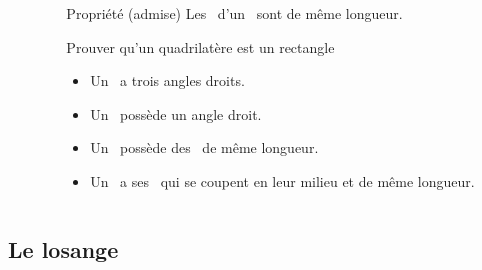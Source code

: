 \documentclass{beamer}
\begin{document}
\begin{frame}
	\frametitle{}  
	\framesubtitle{}
	
		
	\begin{columns}[onlytextwidth]	
		
		\begin{column}{0.4\textwidth}
		\end{column}
		
		\begin{column}{0.6\textwidth}
			
			\begin{alertblock}{Propriété (admise)}
				Les \diags\ d'un \rect\ sont de même longueur.
			\end{alertblock}
			
			\begin{alertblock}{Prouver qu'un quadrilatère est un rectangle}
				\begin{itemize}
					\item Un \myquad\ a trois angles droits.
					\item Un \para\ possède un angle droit.
					\item Un \para\ possède des \diags\ de même longueur.
					\item Un \myquad\ a ses \diags\ qui se coupent en leur milieu et de même longueur.
				\end{itemize}
			\end{alertblock}
			
		\end{column}
		
	\end{columns}
	
\end{frame}
\subsection{Le losange}
\end{document}

